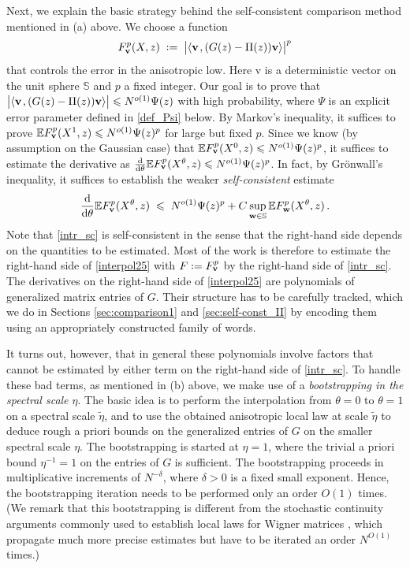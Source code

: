 \documentclass[11pt]{article} %
\newcommand{\nc}{\normalcolor}
\numberwithin{equation}{section}
\numberwithin{figure}{section}
\theoremstyle{plain} %
\theoremstyle{definition} %
\newcommand{\f}[1]{\boldsymbol{\mathrm{#1}}} %
\newcommand{\bb}{\mathbb} %
\newcommand{\E}{\mathbb{E}}
\newcommand{\dd}{\mathrm{d}}
\newcommand*{\deq}{\mathrel{\vcenter{\baselineskip0.65ex \lineskiplimit0pt \hbox{.}\hbox{.}}}=}
\renewcommand{\leq}{\leqslant}
\newcommand{\absb}[1]{\bigl\lvert #1 \bigr\rvert}
\newcommand{\scalar}[2]{\langle{#1} \mspace{2mu}, {#2}\rangle}
\begin{document}
Next, we explain the basic strategy behind the self-consistent comparison method mentioned in (a) above. We choose a function
\begin{equation*}
F_{\f v}^p(X,z) \;\deq\; \absb{\scalar{\f v}{(G(z) - \Pi(z)) \f v}}^p
\end{equation*}
that controls the error in the anisotropic low. Here $\f v$ is a deterministic vector on the unit sphere $\bb S$ and $p$ a fixed integer. Our goal is to prove that $\absb{\scalar{\f v}{(G(z) - \Pi(z)) \f v}}   \leq  N^{o(1)} \nc \Psi(z)$ with high probability, where $\Psi$ is an explicit error parameter defined in \eqref{def_Psi} below. By Markov's inequality, it suffices to prove $\E F_{\f v}^p(X^1,z)   \leq N^{o(1)} \nc \Psi(z)^p$ for large but fixed $p$. Since we know (by assumption on the Gaussian case) that $\E F_{\f v}^p(X^0,z)   \leq N^{o(1)} \nc \Psi(z)^p$, it suffices to estimate the derivative as $\frac{\dd}{\dd \theta} \E F_{\f v}^p(X^\theta,z)  \leq N^{o(1)} \nc \Psi(z)^p$. In fact, by Gr\"onwall's inequality, it suffices to establish the weaker \emph{self-consistent} estimate
\begin{equation} \label{intr_sc}
\frac{\dd}{\dd \theta} \E F_{\f v}^p(X^\theta,z)  \;\leq\; N^{o(1)} \nc \Psi(z)^p + C \sup_{\f w \in \bb S} \E F_{\f w}^p(X^\theta, z)\,.
\end{equation} 
Note that \eqref{intr_sc} is self-consistent in the sense that the right-hand side depends on the quantities to be estimated. Most of the work is therefore to estimate the right-hand side of \eqref{interpol25} with $F \deq F_{\f v}^p$ by the right-hand side of \eqref{intr_sc}. The derivatives on the right-hand side of \eqref{interpol25} are polynomials of generalized matrix entries of $G$. Their structure has to be carefully tracked, which we do in Sections \ref{sec:comparison1} and \ref{sec:self-const_II} by encoding them using an appropriately constructed family of words.

It turns out, however, that in general these polynomials involve factors that cannot be estimated by either term on the right-hand side of \eqref{intr_sc}. To handle these bad terms, as mentioned in (b) above, we make use of a \emph{bootstrapping in the spectral scale $\eta$}. The basic idea is to perform the interpolation from $\theta = 0$ to $\theta = 1$ on a spectral scale $\tilde \eta$, and to use the obtained anisotropic local law at scale $\tilde \eta$ to deduce rough a priori bounds on the generalized entries of $G$ on the smaller spectral scale $\eta$. The bootstrapping is started at $\eta = 1$, where the trivial a priori bound $\eta^{-1} = 1$ on the entries of $G$ is sufficient. The bootstrapping proceeds in multiplicative increments of $N^{-\delta}$, where $\delta > 0$ is a fixed small exponent. Hence, the bootstrapping iteration needs to be performed only an order $O(1)$ times. (We remark that this bootstrapping is different from the stochastic continuity arguments commonly used to establish local laws for Wigner matrices \cite{EKYY1, EKYY4, ESY2}, which propagate much more precise estimates but have to be iterated an order $N^{O(1)}$ times.)
\end{document}
